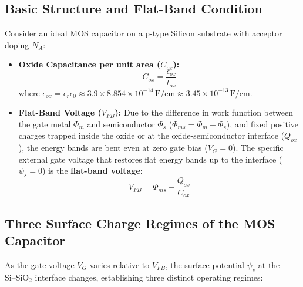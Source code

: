 \documentclass[12pt,a4paper]{article}
\begin{document}
\subsection{Basic Structure and Flat-Band Condition}
Consider an ideal MOS capacitor on a p-type Silicon substrate with acceptor doping $N_A$:
\begin{itemize}[leftmargin=*, itemsep=3pt]
  \item \textbf{Oxide Capacitance per unit area ($C_{ox}$):}
  \begin{equation}
    C_{ox} = \frac{\epsilon_{ox}}{t_{ox}}
  \end{equation}
  where $\epsilon_{ox} = \epsilon_r \epsilon_0 \approx 3.9 \times 8.854 \times 10^{-14}\,\text{F/cm} \approx 3.45 \times 10^{-13}\,\text{F/cm}$.
  \item \textbf{Flat-Band Voltage ($V_{FB}$):} Due to the difference in work function between the gate metal $\Phi_m$ and semiconductor $\Phi_s$ ($\Phi_{ms} = \Phi_m - \Phi_s$), and fixed positive charges trapped inside the oxide or at the oxide-semiconductor interface ($Q_{ox}$), the energy bands are bent even at zero gate bias ($V_G = 0$). The specific external gate voltage that restores flat energy bands up to the interface ($\psi_s = 0$) is the \textbf{flat-band voltage}:
  \begin{equation}
    V_{FB} = \Phi_{ms} - \frac{Q_{ox}}{C_{ox}}
  \end{equation}
\end{itemize}

\subsection{Three Surface Charge Regimes of the MOS Capacitor}
As the gate voltage $V_G$ varies relative to $V_{FB}$, the surface potential $\psi_s$ at the $\text{Si}\text{--}\text{SiO}_2$ interface changes, establishing three distinct operating regimes:
\end{document}
